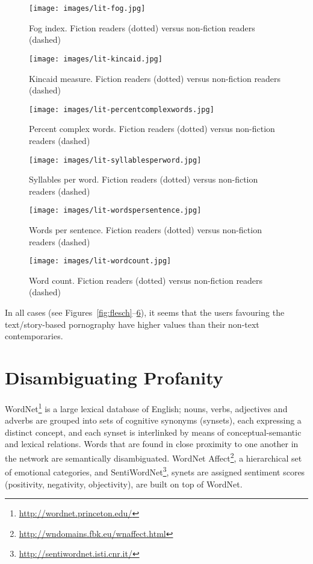 \documentclass[letterpaper]{article}
\begin{document}
\begin{figure}[!hp]
\centering
\texttt{[image: images/lit-fog.jpg]}
\caption{Fog index. Fiction readers (dotted) versus non-fiction readers (dashed)}
\label{fig:fog}
\end{figure}

\begin{figure}[!hp]
\centering
\texttt{[image: images/lit-kincaid.jpg]}
\caption{Kincaid measure. Fiction readers (dotted) versus non-fiction readers (dashed)}
\label{fig:kincaid}
\end{figure}

\begin{figure}[!hp]
\centering
\texttt{[image: images/lit-percentcomplexwords.jpg]}
\caption{Percent complex words. Fiction readers (dotted) versus non-fiction readers (dashed)}
\label{fig:percentcomplex}
\end{figure}

\begin{figure}[!hp]
\centering
\texttt{[image: images/lit-syllablesperword.jpg]}
\caption{Syllables per word. Fiction readers (dotted) versus non-fiction readers (dashed)}
\label{fig:syllables}
\end{figure}

\begin{figure}[tp]
\centering
\texttt{[image: images/lit-wordspersentence.jpg]}
\caption{Words per sentence. Fiction readers (dotted) versus non-fiction readers (dashed)}
\label{fig:wordpersent}
\end{figure}

\begin{figure}[tp]
\centering
\texttt{[image: images/lit-wordcount.jpg]}
\caption{Word count. Fiction readers (dotted) versus non-fiction readers (dashed)}
\label{fig:wordcount}
\end{figure}

In all cases (see Figures~\ref{fig:flesch}--\ref{fig:wordcount}), it
seems that the users favouring the text/story-based pornography have
higher values than their non-text contemporaries.


\section{Disambiguating Profanity}

WordNet\footnote{\url{http://wordnet.princeton.edu/}} is a large
lexical database of English; nouns, verbs, adjectives and adverbs are
grouped into sets of cognitive synonyms (synsets), each expressing a
distinct concept, and each synset is interlinked by means of
conceptual-semantic and lexical relations. Words that are found in
close proximity to one another in the network are semantically
disambiguated. WordNet
Affect\footnote{\url{http://wndomains.fbk.eu/wnaffect.html}}, a
hierarchical set of emotional categories, and
SentiWordNet\footnote{\url{http://sentiwordnet.isti.cnr.it/}}, synets
are assigned sentiment scores (positivity, negativity, objectivity),
are built on top of WordNet.
\end{document}
